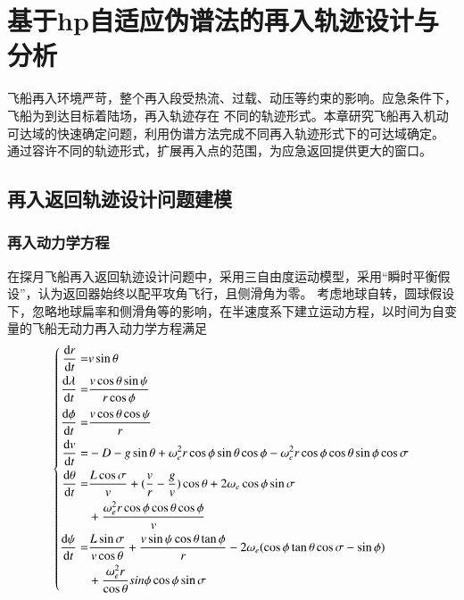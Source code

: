 \chapter{基于hp自适应伪谱法的再入轨迹设计与分析}

飞船再入环境严苛，整个再入段受热流、过载、动压等约束的影响。应急条件下，飞船为到达目标着陆场，再入轨迹存在
不同的轨迹形式。本章研究飞船再入机动可达域的快速确定问题，利用伪谱方法完成不同再入轨迹形式下的可达域确定。
通过容许不同的轨迹形式，扩展再入点的范围，为应急返回提供更大的窗口。

\section{再入返回轨迹设计问题建模}
\subsection{再入动力学方程}
在探月飞船再入返回轨迹设计问题中，采用三自由度运动模型，采用“瞬时平衡假设”，认为返回器始终以配平攻角飞行，且侧滑角为零。
考虑地球自转，圆球假设下，忽略地球扁率和侧滑角等的影响，在半速度系下建立运动方程，以时间为自变量的飞船无动力再入动力学方程满足
\begin{equation}
	\left\{
	\begin{aligned}
		\frac{\dif r}{\dif t}=       & v \sin \theta                                                           \\
		\frac{\dif \lambda}{\dif t}= & \frac{v \cos \theta \sin \psi}
		{r \cos \phi}                                                                                          \\
		\frac{\dif \phi}{\dif t}=    & \frac{v \cos \theta \cos \psi}{r}                                       \\
		\frac{\dif v}{\dif t}=       & -D-g \sin \theta +\omega_e^2r\cos\phi \sin\theta \cos\phi-
		\omega_e^2r\cos\phi\cos\theta\sin\phi\cos\sigma                                                        \\
		\frac{\dif\theta}{\dif t} =  & \frac{L\cos\sigma}{v}+(\frac{v}{r}-
		\frac{g}{v})\cos\theta+2\omega_e\cos\phi\sin\sigma                                                     \\
		                             & {}+\frac{\omega_e^2r\cos\phi\cos\theta\cos\phi}{v}                      \\
		\frac{\dif\psi}{\dif t} =    & \frac{L\sin\sigma}{v\cos\theta}+\frac{v\sin \psi\cos \theta\tan\phi}{r}
		-2\omega_e(\cos\phi\tan\theta\cos\sigma-\sin\phi)                                                      \\
		                             & {}+\frac{\omega_e^2r}{\cos\theta}sin\phi\cos\phi\sin\sigma
	\end{aligned}
	\right.
\end{equation}
